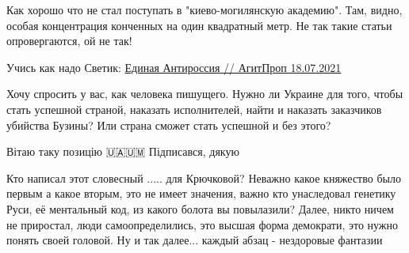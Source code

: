 \begin{itemize}
Как хорошо что не стал поступать в "киево-могилянскую академию". Там, видно,
особая концентрация конченных на один квадратный метр. Не так такие статьи
опровергаются, ой не так!

\begin{itemize}
 
Учись как надо Светик: 
\href{https://www.youtube.com/watch?v=3nduxNw0VYs}{Единая Антироссия // АгитПроп 18.07.2021}

\end{itemize}

 
Хочу спросить у вас, как человека пишущего. Нужно ли Украине для того, чтобы стать успешной страной, наказать исполнителей, найти и наказать заказчиков убийства Бузины? Или страна сможет стать успешной и без этого?

 
Вітаю таку позицію 🇺🇦🇺🇲
Підписався, дякую

 

Кто написал этот словесный ..... для Крючковой? Неважно какое княжество было
первым а какое вторым, это не имеет значения, важно кто унаследовал генетику
Руси, её ментальный код, из какого болота вы повылазили? Далее, никто ничем не
приростал, люди самоопределились, это высшая форма демократи, это нужно понять
своей головой. Ну и так далее... каждый абзац - нездоровые фантазии 🤢

 

\end{itemize}
